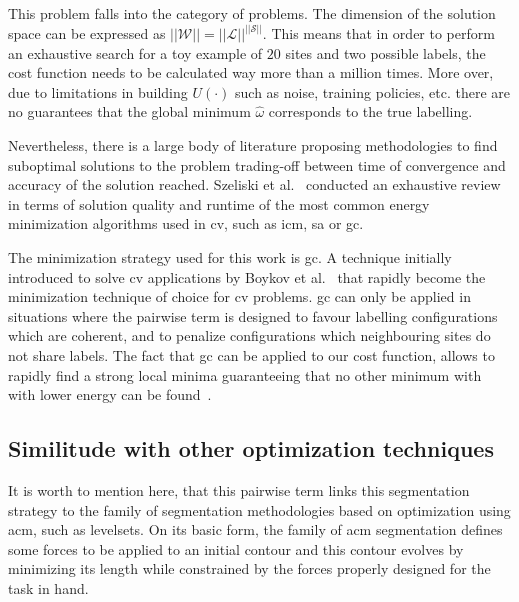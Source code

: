 This problem falls into the category of  problems. 
The dimension of the solution space can be expressed as $||\mathcal{W}|| = ||\mathcal{L}||^{||\mathcal{S}||}$. 
This means that in order to perform an exhaustive search for a toy example of $20$ sites and two possible labels, the cost function needs to be calculated way more than a million times. 
More over, due to limitations in building $U(\cdot)$ such as noise, training policies, etc. there are no guarantees that the global minimum $\hat{\omega}$ corresponds to the true labelling.

Nevertheless, there is a large body of literature proposing methodologies to find suboptimal solutions to the problem trading-off between time of convergence and accuracy of the solution reached.
Szeliski et al.~\cite{szeliski2008comparative} conducted an exhaustive review in terms of solution quality and runtime of the most common energy minimization algorithms used in \ac{cv}, such as \ac{icm}, \ac{sa} or \ac{gc}.

The minimization strategy used for this work is \ac{gc}. 
A technique initially introduced to solve \ac{cv} applications by Boykov et al.~\cite{boykov2001fast} that rapidly become the minimization technique of choice for \ac{cv} problems.
\ac{gc} can only be applied in situations where the pairwise term is designed to favour labelling configurations which are coherent, and to penalize configurations which neighbouring sites do not share labels.
The fact that \ac{gc} can be applied to our cost function, allows to rapidly find a strong local minima guaranteeing that no other minimum with with lower energy can be found~\cite{delong2012fast}. 

\subsection{Similitude with other optimization techniques}
It is worth to mention here, that this pairwise term links this segmentation strategy to the family of segmentation methodologies based on optimization using \ac{acm}, such as levelsets.
On its basic form, the family of \ac{acm} segmentation defines some forces to be applied to an initial contour and this contour evolves by minimizing its length while constrained by the forces properly designed for the task in hand.

%
%
%
%

